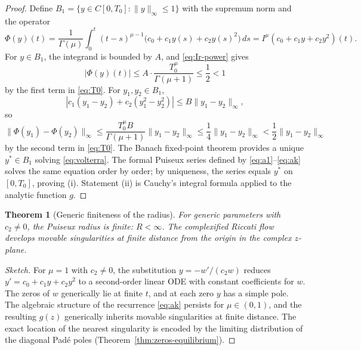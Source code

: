 \documentclass[11pt]{article}
\newtheorem{theorem}{Theorem}[section]
\theoremstyle{definition}
\theoremstyle{remark}
\begin{document}
\begin{proof}
Define $B_{1}=\{y\in C[0,T_{0}]:\|y\|_{\infty}\le 1\}$ with the supremum norm and the operator
\begin{equation}
\Phi(y)(t)=\frac{1}{\Gamma(\mu)}\int_{0}^{t}(t-s)^{\mu-1}\bigl(c_{0}+c_{1}y(s)+c_{2}y(s)^{2}\bigr)\,ds=I^{\mu}(c_{0}+c_{1}y+c_{2}y^{2})(t).
\label{eq:phi-op}
\end{equation}
For $y\in B_{1}$, the integrand is bounded by $A$, and \eqref{eq:Ir-power} gives
\begin{equation}
|\Phi(y)(t)|\le A\cdot\frac{T_{0}^{\mu}}{\Gamma(\mu+1)}\le\frac{1}{2}<1
\label{eq:phi-bound}
\end{equation}
by the first term in \eqref{eq:T0}. For $y_{1},y_{2}\in B_{1}$,
\begin{equation}
|c_{1}(y_{1}-y_{2})+c_{2}(y_{1}^{2}-y_{2}^{2})|\le B\|y_{1}-y_{2}\|_{\infty},
\label{eq:lipschitz}
\end{equation}
so
\begin{equation}
\|\Phi(y_{1})-\Phi(y_{2})\|_{\infty}\le \frac{T_{0}^{\mu}B}{\Gamma(\mu+1)}\|y_{1}-y_{2}\|_{\infty}\le\frac{1}{4}\|y_{1}-y_{2}\|_{\infty}<\frac{1}{2}\|y_{1}-y_{2}\|_{\infty}
\label{eq:contraction}
\end{equation}
by the second term in \eqref{eq:T0}. The Banach fixed-point theorem provides a unique $y^{\ast}\in B_{1}$ solving \eqref{eq:volterra}. The formal Puiseux series defined by \eqref{eq:a1}--\eqref{eq:ak} solves the same equation order by order; by uniqueness, the series equals $y^{\ast}$ on $[0,T_{0}]$, proving (i). Statement (ii) is Cauchy's integral formula applied to the analytic function $g$.
\end{proof}

\begin{theorem}[Generic finiteness of the radius]
\label{thm:radius-finite}
For generic parameters with $c_{2}\ne 0$, the Puiseux radius is finite: $R<\infty$. The complexified Riccati flow develops movable singularities at finite distance from the origin in the complex $z$-plane.
\end{theorem}

\begin{proof}[Sketch]
For $\mu=1$ with $c_{2}\ne 0$, the substitution $y=-w'/(c_{2}w)$ reduces $y'=c_{0}+c_{1}y+c_{2}y^{2}$ to a second-order linear ODE with constant coefficients for $w$. The zeros of $w$ generically lie at finite $t$, and at each zero $y$ has a simple pole. The algebraic structure of the recurrence \eqref{eq:ak} persists for $\mu\in(0,1)$, and the resulting $g(z)$ generically inherits movable singularities at finite distance. The exact location of the nearest singularity is encoded by the limiting distribution of the diagonal Pad\'e poles (Theorem~\ref{thm:zeros-equilibrium}).
\end{proof}
\end{document}
